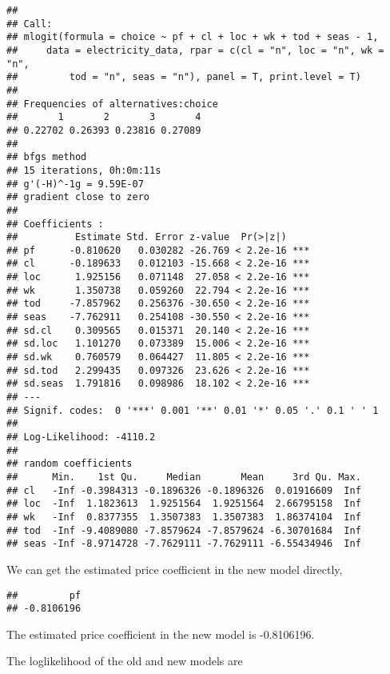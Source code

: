 \documentclass[
]{article}
\newenvironment{Shaded}{\begin{snugshade}}{\end{snugshade}}
\newcommand{\DecValTok}[1]{\textcolor[rgb]{0.00,0.00,0.81}{#1}}
\newcommand{\NormalTok}[1]{#1}
\newcommand{\OperatorTok}[1]{\textcolor[rgb]{0.81,0.36,0.00}{\textbf{#1}}}
\newcommand{\StringTok}[1]{\textcolor[rgb]{0.31,0.60,0.02}{#1}}
\begin{document}
\begin{verbatim}
## 
## Call:
## mlogit(formula = choice ~ pf + cl + loc + wk + tod + seas - 1, 
##     data = electricity_data, rpar = c(cl = "n", loc = "n", wk = "n", 
##         tod = "n", seas = "n"), panel = T, print.level = T)
## 
## Frequencies of alternatives:choice
##       1       2       3       4 
## 0.22702 0.26393 0.23816 0.27089 
## 
## bfgs method
## 15 iterations, 0h:0m:11s 
## g'(-H)^-1g = 9.59E-07 
## gradient close to zero 
## 
## Coefficients :
##          Estimate Std. Error z-value  Pr(>|z|)    
## pf      -0.810620   0.030282 -26.769 < 2.2e-16 ***
## cl      -0.189633   0.012103 -15.668 < 2.2e-16 ***
## loc      1.925156   0.071148  27.058 < 2.2e-16 ***
## wk       1.350738   0.059260  22.794 < 2.2e-16 ***
## tod     -7.857962   0.256376 -30.650 < 2.2e-16 ***
## seas    -7.762911   0.254108 -30.550 < 2.2e-16 ***
## sd.cl    0.309565   0.015371  20.140 < 2.2e-16 ***
## sd.loc   1.101270   0.073389  15.006 < 2.2e-16 ***
## sd.wk    0.760579   0.064427  11.805 < 2.2e-16 ***
## sd.tod   2.299435   0.097326  23.626 < 2.2e-16 ***
## sd.seas  1.791816   0.098986  18.102 < 2.2e-16 ***
## ---
## Signif. codes:  0 '***' 0.001 '**' 0.01 '*' 0.05 '.' 0.1 ' ' 1
## 
## Log-Likelihood: -4110.2
## 
## random coefficients
##      Min.    1st Qu.     Median       Mean     3rd Qu. Max.
## cl   -Inf -0.3984313 -0.1896326 -0.1896326  0.01916609  Inf
## loc  -Inf  1.1823613  1.9251564  1.9251564  2.66795158  Inf
## wk   -Inf  0.8377355  1.3507383  1.3507383  1.86374104  Inf
## tod  -Inf -9.4089080 -7.8579624 -7.8579624 -6.30701684  Inf
## seas -Inf -8.9714728 -7.7629111 -7.7629111 -6.55434946  Inf
\end{verbatim}

We can get the estimated price coefficient in the new model directly,

\begin{Shaded}
\end{Shaded}

\begin{verbatim}
##         pf 
## -0.8106196
\end{verbatim}

The estimated price coefficient in the new model is -0.8106196.

The loglikelihood of the old and new models are
\end{document}

